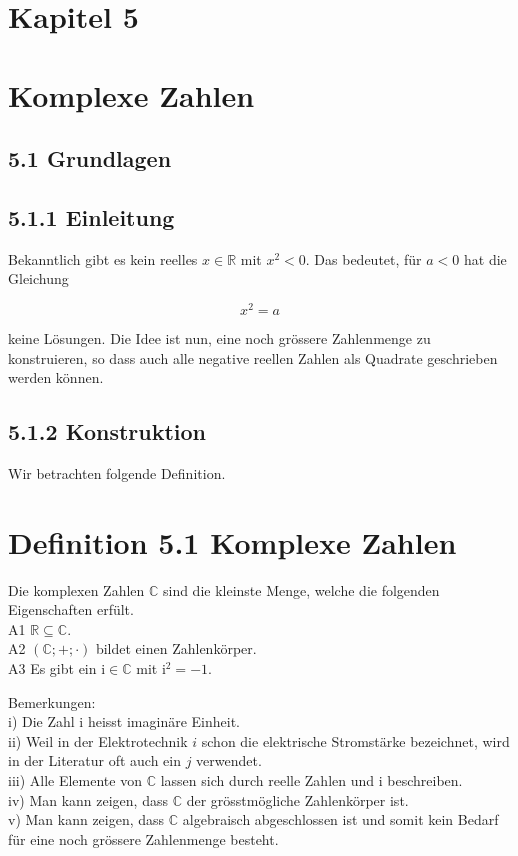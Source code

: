 \documentclass[10pt]{article}
\begin{document}
\section*{Kapitel 5}
\section*{Komplexe Zahlen}
\subsection*{5.1 Grundlagen}
\subsection*{5.1.1 Einleitung}
Bekanntlich gibt es kein reelles $x \in \mathbb{R}$ mit $x^{2}<0$. Das bedeutet, für $a<0$ hat die Gleichung


\begin{equation*}
x^{2}=a \tag{5.1}
\end{equation*}


keine Lösungen. Die Idee ist nun, eine noch grössere Zahlenmenge zu konstruieren, so dass auch alle negative reellen Zahlen als Quadrate geschrieben werden können.

\subsection*{5.1.2 Konstruktion}
Wir betrachten folgende Definition.

\section*{Definition 5.1 Komplexe Zahlen}
Die komplexen Zahlen $\mathbb{C}$ sind die kleinste Menge, welche die folgenden Eigenschaften erfült.\\
A1 $\mathbb{R} \subseteq \mathbb{C}$.\\
A2 $(\mathbb{C} ;+; \cdot)$ bildet einen Zahlenkörper.\\
A3 Es gibt ein $\mathrm{i} \in \mathbb{C}$ mit $\mathrm{i}^{2}=-1$.

Bemerkungen:\\
i) Die Zahl i heisst imaginäre Einheit.\\
ii) Weil in der Elektrotechnik $i$ schon die elektrische Stromstärke bezeichnet, wird in der Literatur oft auch ein $j$ verwendet.\\
iii) Alle Elemente von $\mathbb{C}$ lassen sich durch reelle Zahlen und i beschreiben.\\
iv) Man kann zeigen, dass $\mathbb{C}$ der grösstmögliche Zahlenkörper ist.\\
v) Man kann zeigen, dass $\mathbb{C}$ algebraisch abgeschlossen ist und somit kein Bedarf für eine noch grössere Zahlenmenge besteht.
\end{document}

